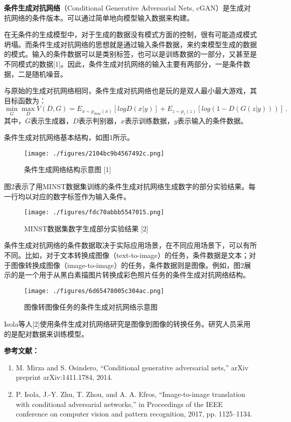 

\textbf{条件生成对抗网络}（Conditional Generative Adversarial Nets, cGAN）是生成对抗网络的条件版本。可以通过简单地向模型输入数据来构建。

在无条件的生成模型中，对于生成的数据没有模式方面的控制，很有可能造成模式坍塌。而条件生成对抗网络的思想就是通过输入条件数据，来约束模型生成的数据的模式。输入的条件数据可以是类别标签，也可以是训练数据的一部分，又甚至是不同模式的数据[1]。因此，条件生成对抗网络的输入主要有两部分，一是条件数据，二是随机噪音。

与原始的生成对抗网络相同，条件生成对抗网络也是玩的是双人最小最大游戏，其目标函数为：
\begin{equation}
\mathop{\min}\limits_G \mathop {\max }\limits_D V(D,G)=E_{x\sim p_{data}(x)}[logD(x|y)]+E_{z\sim p_z(z)}[log(1-D(G(z|y)))]~.
\end{equation}
其中，$G$表示生成器，$D$表示判别器，$x$表示训练数据，$y$表示输入的条件数据。

条件生成对抗网络基本结构，如图1所示。
\begin{figure}[ht]
\centering
\texttt{[image: ./figures/2104bc9b4567492c.png]}
\caption{条件生成网络结构示意图 [1]} \label{fig_cGAN_1}
\end{figure}

图2表示了用MINST数据集训练的条件生成对抗网络生成数字的部分实验结果。每一行均以对应的数字标签作为输入条件。
\begin{figure}[ht]
\centering
\texttt{[image: ./figures/fdc70abbb5547015.png]}
\caption{MINST数据集数字生成部分实验结果 [2]} \label{fig_cGAN_2}
\end{figure}

条件生成对抗网络的条件数据取决于实际应用场景，在不同应用场景下，可以有所不同。比如，对于文本转换成图像（text-to-image）的任务，条件数据是文本；对于图像转换成图像（image-to-image）的任务，条件数据则是图像。例如，图2展示的是一个用于从黑白素描图片转换成彩色照片任务的条件生成对抗网络结构。

\begin{figure}[ht]
\centering
\texttt{[image: ./figures/6d65478005c304ac.png]}
\caption{图像转图像任务的条件生成对抗网络示意图} \label{fig_cGAN_3}
\end{figure}

Isola等人[2]使用条件生成对抗网络研究是图像到图像的转换任务。研究人员采用的是配对数据来训练模型。


\textbf{参考文献：}
\begin{enumerate}
\item M. Mirza and S. Osindero, “Conditional generative adversarial nets,” arXiv preprint arXiv:1411.1784, 2014.
\item P. Isola, J.-Y. Zhu, T. Zhou, and A. A. Efros, “Image-to-image translation with conditional adversarial networks,” in Proceedings of the IEEE conference on computer vision and pattern recognition, 2017, pp. 1125–1134.
\end{enumerate}
